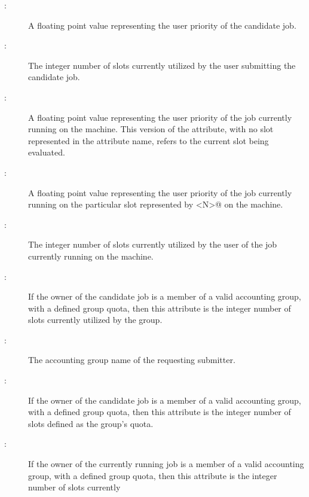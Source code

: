 \begin{description}

\item[:] 
  A floating point value representing the user priority of the 
  candidate job.
\item[:] 
  The integer number of slots currently utilized by the user
  submitting the candidate job.
\item[:]
  A floating point value representing the user priority of the 
  job currently running on the machine.
  This version of the attribute, with no slot represented in the attribute name,
  refers to the current slot being evaluated.
\item[:]
  A floating point value representing the user priority of the 
  job currently running on the particular slot represented
  by \verb@<N>@ on the machine.
\item[:]
  The integer number of slots currently utilized by the user
  of the job currently running on the machine.
\item[:]
  If the owner of the candidate job is a member of a valid accounting group,
  with a defined group quota,
  then this attribute is the integer number of slots currently 
  utilized by the group.
\item[:]
  The accounting group name of the requesting submitter.
\item[:]
  If the owner of the candidate job is a member of a valid accounting group,
  with a defined group quota,
  then this attribute is the integer number of slots defined as the
  group's quota.
\item[:]
  If the owner of the currently running job is a member of a valid 
  accounting group, with a defined group quota,
  then this attribute is the integer number of slots currently 

\end{description}

